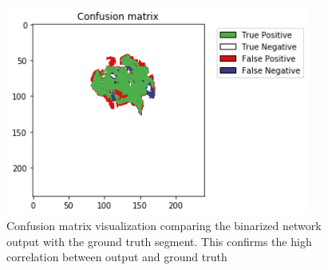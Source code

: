 \begin{figure}[H]
\centering
\includegraphics[width=10cm]{chapters/04_segmentation/images/confusion_matrix.png}
\caption{Confusion matrix visualization comparing the binarized network output with the ground truth segment. This confirms the high correlation between output and ground truth}
\end{figure}
